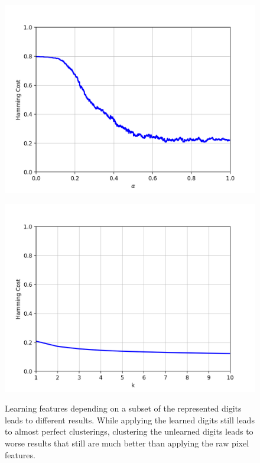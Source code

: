 \begin{figure}[h]
\begin{minipage}{.3\textwidth}
\end{minipage}\quad
\begin{minipage}{.3\textwidth}
  \centering
  {\includegraphics[width=\linewidth]{plots/mnist-cnn-sub-sc}}
\end{minipage}\quad
\begin{minipage}{.3\textwidth}
  \centering
  {\includegraphics[width=\linewidth]{plots/mnist-cnn-sub-sc-top10}}
\end{minipage}
\caption{Learning features depending on a subset of the represented digits leads to different results. While applying the learned digits still leads to almost perfect clusterings, clustering the unlearned digits leads to worse results that still are much better than applying the raw pixel features.}
\label{fig:mnist1000cnnsub}
\end{figure}

